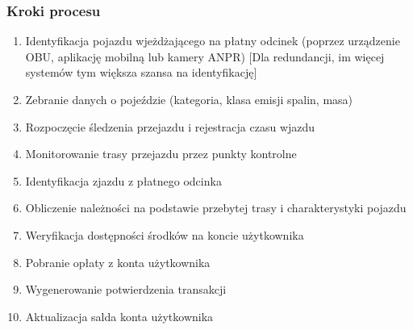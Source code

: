 \subsubsection{Kroki procesu}
\begin{enumerate}
    \item Identyfikacja pojazdu wjeżdżającego na płatny odcinek (poprzez urządzenie OBU, aplikację mobilną lub kamery ANPR) [Dla redundancji, im więcej systemów tym większa szansa na identyfikację]
    \item Zebranie danych o pojeździe (kategoria, klasa emisji spalin, masa)
    \item Rozpoczęcie śledzenia przejazdu i rejestracja czasu wjazdu
    \item Monitorowanie trasy przejazdu przez punkty kontrolne
    \item Identyfikacja zjazdu z płatnego odcinka
    \item Obliczenie należności na podstawie przebytej trasy i charakterystyki pojazdu
    \item Weryfikacja dostępności środków na koncie użytkownika
    \item Pobranie opłaty z konta użytkownika
    \item Wygenerowanie potwierdzenia transakcji
    \item Aktualizacja salda konta użytkownika
\end{enumerate}

